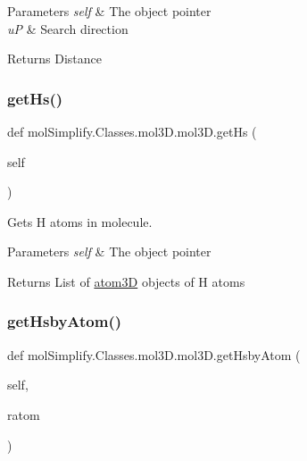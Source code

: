 \begin{DoxyParams}{Parameters}
{\em self} & The object pointer \\
\hline
{\em uP} & Search direction \\
\hline
\end{DoxyParams}
\begin{DoxyReturn}{Returns}
Distance 
\end{DoxyReturn}
\mbox{\label{classmolSimplify_1_1Classes_1_1mol3D_1_1mol3D_a5b27778bb5e730b3911e0fe9192a4c0e}} 
\subsubsection{\texorpdfstring{get\+Hs()}{getHs()}}
{\footnotesize\ttfamily def mol\+Simplify.\+Classes.\+mol3\+D.\+mol3\+D.\+get\+Hs (\begin{DoxyParamCaption}\item[{}]{self }\end{DoxyParamCaption})}



Gets H atoms in molecule. 


\begin{DoxyParams}{Parameters}
{\em self} & The object pointer \\
\hline
\end{DoxyParams}
\begin{DoxyReturn}{Returns}
List of \hyperlink{namespacemolSimplify_1_1Classes_1_1atom3D}{atom3D} objects of H atoms 
\end{DoxyReturn}
\mbox{\label{classmolSimplify_1_1Classes_1_1mol3D_1_1mol3D_a232adbbe11745aac4561a15fe1850df4}} 
\subsubsection{\texorpdfstring{get\+Hsby\+Atom()}{getHsbyAtom()}}
{\footnotesize\ttfamily def mol\+Simplify.\+Classes.\+mol3\+D.\+mol3\+D.\+get\+Hsby\+Atom (\begin{DoxyParamCaption}\item[{}]{self,  }\item[{}]{ratom }\end{DoxyParamCaption})}



